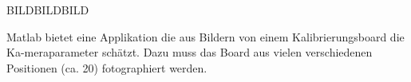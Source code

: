 BILDBILDBILD

Matlab bietet eine Applikation die aus Bildern von einem Kalibrierungsboard die Ka-meraparameter schätzt. Dazu muss das Board aus vielen verschiedenen Positionen (ca. 20) fotographiert werden. 

\begin{figure}[ht]
\end{figure}
